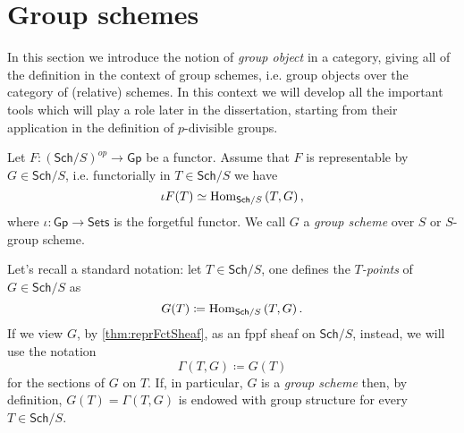 \section{Group schemes}
In this section we introduce the notion of \emph{group object}
in a category, giving all of the definition in the context
of group schemes, i.e. group objects over the category of (relative) schemes.
In this context we will develop all the important tools which will play a role
later in the dissertation, starting from their application in the definition of
$p$-divisible groups.


\begin{defn}
	Let $F\colon (\mathsf{Sch}/S)^{op} \to \mathsf{Gp}$ be a functor.
	Assume that $F$ is representable by $G \in \mathsf{Sch}/S$, i.e. 
	functorially in $T \in \mathsf{Sch}/S$ we have
	\begin{equation*}
		\iota F(T) \simeq \operatorname{Hom}_{\mathsf{Sch}/S} \left( T, G \right)
	,\end{equation*} 
	where $\iota\colon \mathsf{Gp} \to \mathsf{Sets}$ is the forgetful functor.
	We call $G$ a \emph{group scheme} over $S$
	or $S$-group scheme.
\end{defn}


\begin{rem}
	Let's recall a standard notation: let $T \in \mathsf{Sch}/S$, one defines
	the \emph{$T$-points} of $G \in \mathsf{Sch}/S$ as
	\begin{equation*}
		G(T) \coloneqq \operatorname{Hom}_{\mathsf{Sch}/S} \left( T, G \right)
	.\end{equation*} 
	If we view $G$, by \cref{thm:reprFctSheaf}, as an fppf sheaf on $\mathsf{Sch}/S$, instead,
	we will use the notation
	\begin{equation*}
		\Gamma \left( T, G \right) \coloneqq G(T)
	\end{equation*}
	for the sections of $G$ on $T$.
	If, in particular, $G$ is a \emph{group scheme} then, by definition,
	$G(T) = \Gamma(T,G)$ is endowed with group structure for every $T \in \mathsf{Sch}/S$.
\end{rem}


